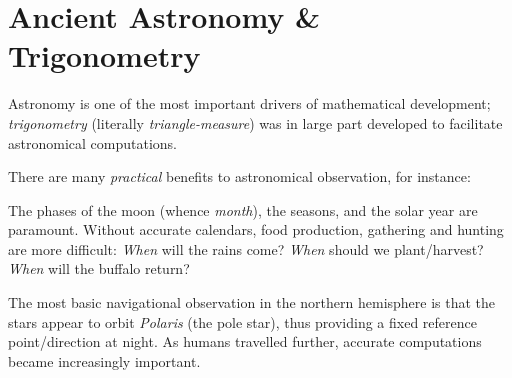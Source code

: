 \graphicspath{{4astro/asy/}}

\section{Ancient Astronomy \& Trigonometry}

Astronomy is one of the most important drivers of mathematical development; \emph{trigonometry} (literally \emph{triangle-measure}) was in large part developed to facilitate astronomical computations.

There are many \emph{practical} benefits to astronomical observation, for instance:
\begin{description}\itemsep0pt
	\item[\normalfont\emph{Calendars}] The phases of the moon (whence \emph{month}), the seasons, and the solar year are paramount. Without accurate calendars, food production, gathering and hunting are more difficult: \emph{When} will the rains come? \emph{When} should we plant/harvest? \emph{When} will the buffalo return? 
	\item[\normalfont\emph{Navigation}] The most basic navigational observation in the northern hemisphere is that the stars appear to orbit \emph{Polaris} (the pole star), thus providing a fixed reference point/direction at night. As humans travelled further, accurate computations became increasingly important.
\end{description}


